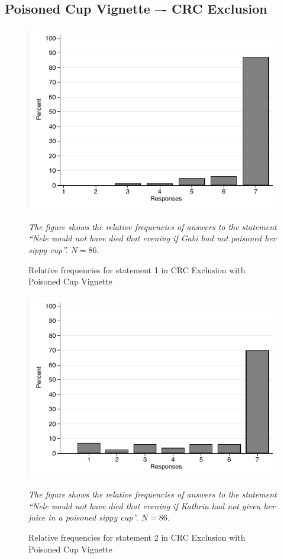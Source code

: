 \documentclass[egregdoesnotlikesansseriftitles,12pt]{scrartcl}
\begin{document}
\subsection{Poisoned Cup Vignette –- CRC Exclusion}
\begin{figure}[H]
   \centering
   \includegraphics[scale=0.8]{figures/cup_crc_hist_1.pdf}
   \begin{minipage}{0.9\linewidth}
   \footnotesize
   \emph{The figure shows the relative frequencies of answers to the statement ``Nele would not have died that evening if Gabi had not poisoned her sippy cup''. $N=86$.}
   \end{minipage}
   \caption{Relative frequencies for statement 1 in CRC Exclusion with Poisoned Cup Vignette}
   \label{fig:cup_crc_hist_1}
\end{figure}

\begin{figure}[H]
   \centering
   \includegraphics[scale=0.8]{figures/cup_crc_hist_2.pdf}
   \begin{minipage}{0.9\linewidth}
   \footnotesize
   \emph{The figure shows the relative frequencies of answers to the statement ``Nele would not have died that evening if Kathrin had not given her juice in a poisoned sippy cup''. $N=86$.}
   \end{minipage}
   \caption{Relative frequencies for statement 2 in CRC Exclusion with Poisoned Cup Vignette}
   \label{fig:cup_crc_hist_2}
\end{figure}
\end{document}
